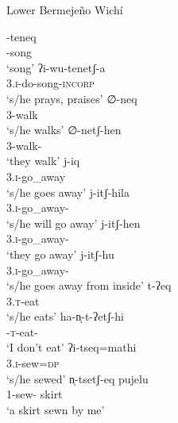\ea\label{ex:q-ch:lbw}
Lower Bermejeño Wichí \citep{VN14}\\
    \begin{xlist}
        \ex\gll -teneq~\\
                -song\\
                \glt `song'
        \ex\gll ʔi-wu-tenetʃ-a~\\
                3.{\textsc{i}}-do-song-\textsc{incorp}\\
                \glt `s/he prays, praises'
        \ex\gll ∅-neq~\\
                3-walk\\
                \glt `s/he walks'
        \ex\gll ∅-netʃ-hen \\
                3-walk-\PL\\
                \glt `they walk'
        \ex\gll j-iq~\\
                3.{\textsc{i}}-go\_away\\
                \glt `s/he goes away'
        \ex\gll j-itʃ-hila~\\
                3.{\textsc{i}}-go\_away-\FUT\\
                \glt `s/he will go away'
        \ex\gll j-itʃ-hen~\\
                3.{\textsc{i}}-go\_away-\PL\\
                \glt `they go away'
        \ex\gll j-itʃ-hu~\\
                3.{\textsc{i}}-go\_away-\APPL\\
                \glt `s/he goes away from inside'
        \ex\gll t-ʔeq~\\
                3.{\textsc{t}}-eat\\
                \glt `s/he eats'
        \ex\gll ha-n̩-t-ʔetʃ-hi~\\
                \SG-\textsc{t}-eat-\NEG\\
                \glt `I don't eat'
        \ex\gll ʔi-tseq=mathi~\\
                3.{\textsc{i}}-sew=\textsc{dp}\\
                \glt `s/he sewed'
        \ex\gll n̩-tsetʃ-eq pujelu~\\
                1\SG-sew-{\PTCP} skirt\\
                \glt `a skirt sewn by me'
    \end{xlist}
\z

